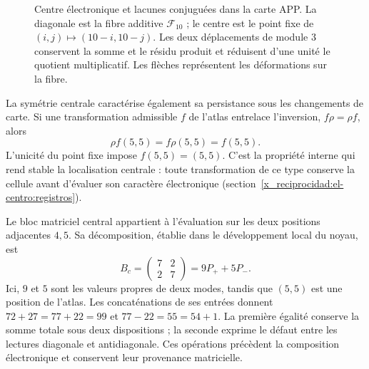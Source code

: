 \begin{figure}[H]
\centering
{}
\caption{Centre électronique et lacunes conjuguées dans la carte APP.
La diagonale est la fibre additive \(\mathcal F_{10}\) ; le centre
est le point fixe de \((i,j)\mapsto(10-i,10-j)\). Les deux
déplacements de module \(3\) conservent la somme et le résidu
produit et réduisent d'une unité le quotient multiplicatif. Les
flèches représentent les déformations sur la fibre.}
\label{x_reciprocidad:el-centro:figura}
\end{figure}



La symétrie centrale caractérise également sa persistance sous les changements de
carte. Si une transformation admissible \(f\) de l'atlas entrelace
l'inversion, \(f\rho=\rho f\), alors
\[
 \rho f(5,5)=f\rho(5,5)=f(5,5).
\]
L’unicité du point fixe impose \(f(5,5)=(5,5)\). C’est la
propriété interne qui rend stable la localisation centrale : toute
transformation de ce type conserve la cellule avant d’évaluer son
caractère électronique (section~\ref{x_reciprocidad:el-centro:registros}).

Le bloc matriciel central appartient à l'évaluation sur les deux
positions adjacentes \(4,5\). Sa décomposition, établie dans le
développement local du noyau, est
\[
 B_c=\begin{pmatrix}7&2\\2&7\end{pmatrix}=9P_++5P_-.
\]
Ici, \(9\) et \(5\) sont les valeurs propres de deux modes, tandis que
\((5,5)\) est une position de l'atlas. Les concaténations de ses
entrées donnent \(72+27=77+22=99\) et
\(77-22=55=54+1\). La première égalité conserve la somme totale sous
deux dispositions ; la seconde exprime le défaut entre les lectures
diagonale et antidiagonale. Ces opérations précèdent la composition
électronique et conservent leur provenance matricielle.

